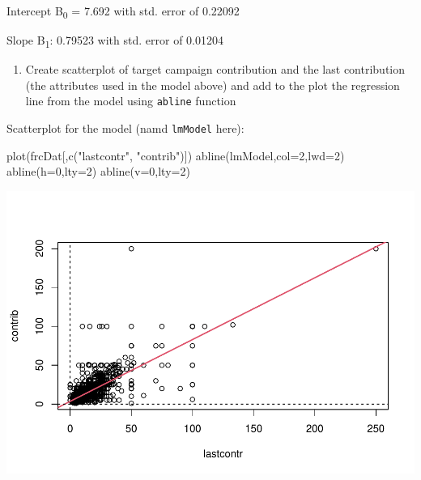 \documentclass[
]{article}
\newenvironment{Shaded}{\begin{snugshade}}{\end{snugshade}}
\newcommand{\AttributeTok}[1]{\textcolor[rgb]{0.77,0.63,0.00}{#1}}
\newcommand{\DecValTok}[1]{\textcolor[rgb]{0.00,0.00,0.81}{#1}}
\newcommand{\FunctionTok}[1]{\textcolor[rgb]{0.00,0.00,0.00}{#1}}
\newcommand{\NormalTok}[1]{#1}
\newcommand{\StringTok}[1]{\textcolor[rgb]{0.31,0.60,0.02}{#1}}
\providecommand{\tightlist}{%
  \setlength{\itemsep}{0pt}\setlength{\parskip}{0pt}}
\begin{document}
Intercept B\textsubscript{0} = 7.692 with std. error of 0.22092

Slope B\textsubscript{1}: 0.79523 with std. error of 0.01204

\begin{enumerate}
\def\labelenumi{\arabic{enumi}.}
\setcounter{enumi}{2}
\tightlist
\item
  Create scatterplot of target campaign contribution and the last
  contribution (the attributes used in the model above) and add to the
  plot the regression line from the model using \texttt{abline} function
\end{enumerate}

Scatterplot for the model (namd \texttt{lmModel} here):

\begin{Shaded}
\begin{Highlighting}[]
\FunctionTok{plot}\NormalTok{(frcDat[,}\FunctionTok{c}\NormalTok{(}\StringTok{"lastcontr"}\NormalTok{, }\StringTok{"contrib"}\NormalTok{)])}
\FunctionTok{abline}\NormalTok{(lmModel,}\AttributeTok{col=}\DecValTok{2}\NormalTok{,}\AttributeTok{lwd=}\DecValTok{2}\NormalTok{)}
\FunctionTok{abline}\NormalTok{(}\AttributeTok{h=}\DecValTok{0}\NormalTok{,}\AttributeTok{lty=}\DecValTok{2}\NormalTok{)}
\FunctionTok{abline}\NormalTok{(}\AttributeTok{v=}\DecValTok{0}\NormalTok{,}\AttributeTok{lty=}\DecValTok{2}\NormalTok{)}
\end{Highlighting}
\end{Shaded}

\includegraphics{linear_regression__uc_files/figure-latex/Problem1_Q2(3)-1.pdf}
\end{document}
